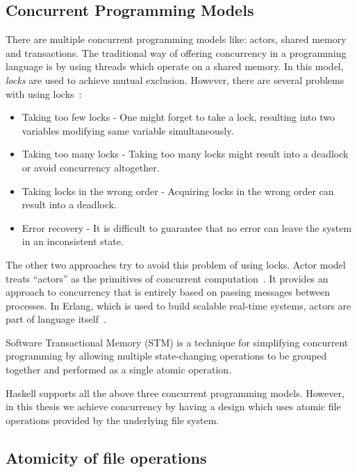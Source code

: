 \subsection{Concurrent Programming Models}

There are multiple concurrent programming models like: actors, shared memory and transactions. The traditional way of offering concurrency in a programming language is by using threads which operate on a shared memory. In this model, \textit{locks} are used to achieve mutual exclusion. However, there are several problems with using locks~\cite{jones2007beautiful}:

\begin{itemize}
  \item Taking too few locks - One might forget to take a lock, resulting into two variables modifying same variable simultaneously.
  \item Taking too many locks - Taking too many locks might result into a deadlock or avoid concurrency altogether.
  \item Taking locks in the wrong order - Acquiring locks in the wrong order can result into a deadlock.
  \item Error recovery - It is difficult to guarantee that no error can leave the system in an inconsistent state.
\end{itemize}

The other two approaches try to avoid this problem of using locks. Actor model treats ``actors'' as the primitives of concurrent computation~\cite{hewitt1973universal}. It provides an approach to concurrency that is entirely based on passing messages between processes. In Erlang, which is used to build scalable real-time systems, actors are part of language itself~\cite{armstrong1993concurrent}.

Software Transactional Memory (STM) is a technique for simplifying concurrent programming by allowing multiple state-changing operations to be grouped together and performed as a single atomic operation.

Haskell supports all the above three concurrent programming models. However, in this thesis we achieve concurrency by having a design which uses atomic file operations provided by the underlying file system.

\subsection{Atomicity of file operations}

